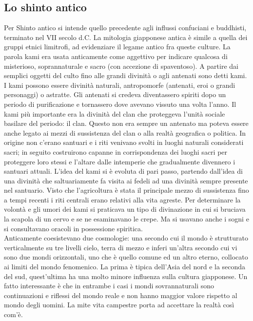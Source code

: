 \documentclass[10pt,a4paper]{report}
\begin{document}
\subsection{Lo shinto antico}
Per Shinto antico si intende quello precedente agli influssi confuciani e buddhisti, terminato nel VII secolo d.C. La mitologia giapponese antica è simile a quella dei gruppi etnici limitrofi, ad evidenziare il legame antico fra queste culture. La parola kami era usata anticamente come aggettivo per indicare qualcosa di misterioso, soprannaturale e sacro (con accezione di spaventoso). A partire dai semplici oggetti del culto fino alle grandi divinità o agli antenati sono detti kami. I kami possono essere divinità naturali, antropomorfe (antenati, eroi o grandi personaggi) o astratte. Gli antenati si credeva diventassero spiriti dopo un periodo di purificazione e tornassero dove avevano vissuto una volta l'anno. Il kami più importante era la divinità del clan che proteggeva l'unità sociale basilare del periodo: il clan. Questo non era sempre un antenato ma poteva essere anche legato ai mezzi di sussistenza del clan o alla realtà geografica o politica. In origine non c'erano santuari e i riti venivano svolti in luoghi naturali considerati sacri; in seguito costruirono capanne in corrispondenza dei luoghi sacri per proteggere loro stessi e l'altare dalle intemperie che gradualmente divennero i santuari attuali. L'idea del kami si è evoluta di pari passo, partendo dall'idea di una divinità che saltuariamente fa visita ai fedeli ad una divinità sempre presente nel santuario. Visto che l'agricoltura è stata il principale mezzo di sussistenza fino a tempi recenti i riti centrali erano relativi alla vita agreste. Per determinare la volontà e gli umori dei kami si praticava un tipo di divinazione in cui si bruciava la scapola di un cervo e se ne esaminavano le crepe. Ma si usavano anche i sogni  e si consultavano oracoli in possessione spiritica.\\
Anticamente coesistevano due cosmologie: una secondo cui il mondo è strutturato verticalmente su tre livelli cielo, terra di mezzo e inferi un'altra secondo cui vi sono due mondi orizzontali, uno che è quello comune ed un altro eterno, collocato ai limiti del mondo fenomenico. La prima è tipica dell'Asia del nord e la seconda del sud, quest'ultima ha una molto minore influenza sulla cultura giapponese. Un fatto interessante è che in entrambe i casi i mondi sovrannaturali sono continuazioni e riflessi del mondo reale e non hanno maggior valore rispetto al mondo degli uomini. La mite vita campestre porta ad accettare la realtà così com'è.
\end{document}
